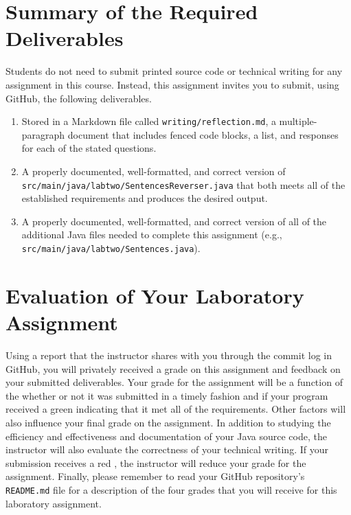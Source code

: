 \documentclass[11pt]{article}
\newcommand{\mainprogramsource}{\lstinline{src/main/java/labtwo/SentencesReverser.java}}
\newcommand{\mainprogramhelpersource}{\lstinline{src/main/java/labtwo/Sentences.java}}
\newcommand{\reflection}{\lstinline{writing/reflection.md}}
\newcommand{\program}[1]{\lstinline{#1}}
\newcommand{\checkmark}{\ding{51}}
\newcommand{\naughtmark}{\ding{55}}
\begin{document}
\section*{Summary of the Required Deliverables}

\noindent Students do not need to submit printed source code or technical
writing for any assignment in this course. Instead, this assignment invites you
to submit, using GitHub, the following deliverables.

\begin{enumerate}

  \setlength{\itemsep}{0in}

\item Stored in a Markdown file called \reflection{}, a multiple-paragraph
  document that includes fenced code blocks, a list, and responses for each of
  the stated questions.

\item A properly documented, well-formatted, and correct version of
  \mainprogramsource{} that both meets all of the established requirements and
  produces the desired output.

\item A properly documented, well-formatted, and correct version of all of the
  additional Java files needed to complete this assignment (e.g.,
  \mainprogramhelpersource).

\end{enumerate}

\section*{Evaluation of Your Laboratory Assignment}

Using a report that the instructor shares with you through the commit log in
GitHub, you will privately received a grade on this assignment and feedback on
your submitted deliverables. Your grade for the assignment will be a function of
the whether or not it was submitted in a timely fashion and if your program
received a green \checkmark{} indicating that it met all of the requirements.
Other factors will also influence your final grade on the assignment. In
addition to studying the efficiency and effectiveness and documentation of your
Java source code, the instructor will also evaluate the correctness of your
technical writing. If your submission receives a red \naughtmark{}, the
instructor will reduce your grade for the assignment. Finally, please remember
to read your GitHub repository's \program{README.md} file for a description of
the four grades that you will receive for this laboratory assignment.
\end{document}
